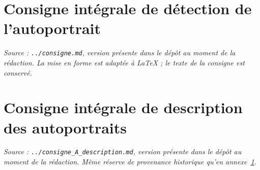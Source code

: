 \documentclass[a4paper,11pt]{article}
\begin{document}
\begingroup
\small
\setlength{\bibsep}{0pt}


\endgroup

\clearpage
\appendix
\section{Consigne intégrale de détection de l'autoportrait}
\label{ann:phase1}
\textit{Source : \texttt{../consigne.md}, version présente dans le dépôt
au moment de la rédaction. La mise en forme est adaptée à LaTeX ; le texte
de la consigne est conservé.}

\begingroup
\footnotesize

\endgroup

\clearpage
\section{Consigne intégrale de description des autoportraits}
\label{ann:phase2}
\textit{Source : \texttt{../consigne\_A\_description.md}, version présente
dans le dépôt au moment de la rédaction. Même réserve de provenance
historique qu'en annexe~\ref{ann:phase1}.}

\begingroup
\footnotesize

\endgroup
\end{document}
